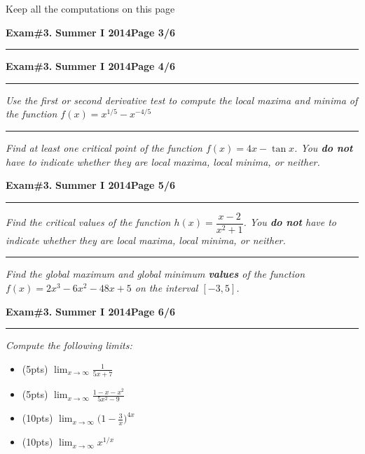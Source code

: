 \documentclass[12pt]{article}
\begin{document}
Keep all the computations on this page
\newpage

\hfill{\large\bf Exam\#3.}\hfill{\large\bf
  Summer I 2014}\hfill{\large\bf Page 3/6}\hrule

\newpage 

\hfill{\large\bf Exam\#3.}\hfill{\large\bf
  Summer I 2014}\hfill{\large\bf Page 4/6}\hrule

\bigskip
{\problem[10 pts] \em Use the first or second derivative test to compute the local maxima and minima of the function $f(x) = x^{1/5} - x^{-4/5}$}

\vspace{10cm}
\hrule
{\problem[10] \em Find at least one critical point of the function $f(x) = 4x - \tan x$.  You \textbf{do not} have to indicate whether they are local maxima, local minima, or neither.}
\vspace{9cm}
\begin{flushright}
\end{flushright}
\newpage

\hfill{\large\bf Exam\#3.}\hfill{\large\bf
  Summer I 2014}\hfill{\large\bf Page 5/6}\hrule

\bigskip
{\problem[10 pts] \em Find the critical values of the function $h(x)=\dfrac{x-2}{x^2+1}$.  You \textbf{do not} have to indicate whether they are local maxima, local minima, or neither.}

\vspace{10cm}
\hrule
{\problem[10pts] \em Find the global maximum and global minimum \textbf{values} of the function $f(x)=2x^3-6x^2-48x+5$ on the interval $[-3,5]$.}
\newpage


\hfill{\large\bf Exam\#3.}\hfill{\large\bf
  Summer I 2014}\hfill{\large\bf Page 6/6}\hrule

\bigskip
{\problem \em Compute the following limits:}
\begin{itemize}
  \item[] (5pts) $\displaystyle{\lim_{x\to \infty} \frac{1}{5x+7}}$
  \vspace{3cm}
  \item[] (5pts) $\displaystyle{\lim_{x\to\infty} \frac{1-x-x^2}{5x^2-9}}$
  \vspace{3cm}
  \item[] (10pts) $\displaystyle{\lim_{x\to\infty} \Big(1-\frac{3}{x} \Big)^{4x}}$
  \vspace{6cm}
  \item[] (10pts) $\displaystyle{\lim_{x\to\infty} x^{1/x}}$
\end{itemize}
\end{document}
